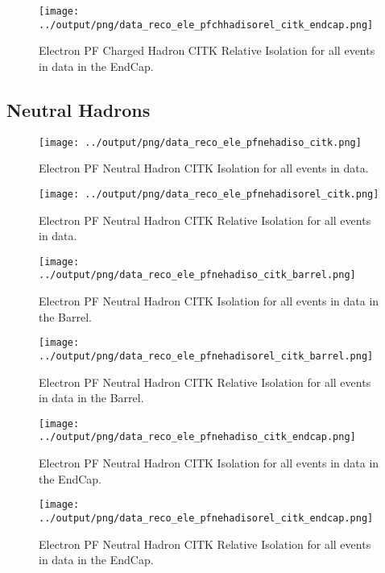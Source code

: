 \documentclass[11pt]{book}
\begin{document}
\begin{figure}[htb]
\centering
\texttt{[image: ../output/png/data\_reco\_ele\_pfchhadisorel\_citk\_endcap.png]}
\caption{Electron PF Charged Hadron CITK Relative Isolation for all events in data in the EndCap.}
\label{fig:data_ele_pfchhadisorel_citk_endcap}
\end{figure}
\clearpage

\subsection{Neutral Hadrons}
\begin{figure}[htb]
\centering
\texttt{[image: ../output/png/data\_reco\_ele\_pfnehadiso\_citk.png]}
\caption{Electron PF Neutral Hadron CITK Isolation for all events in data.}
\label{fig:data_ele_pfnehadiso_citk}
\end{figure}

\begin{figure}[htb]
\centering
\texttt{[image: ../output/png/data\_reco\_ele\_pfnehadisorel\_citk.png]}
\caption{Electron PF Neutral Hadron CITK Relative Isolation for all events in data.}
\label{fig:data_ele_pfnehadisorel_citk}
\end{figure}

\begin{figure}[htb]
\centering
\texttt{[image: ../output/png/data\_reco\_ele\_pfnehadiso\_citk\_barrel.png]}
\caption{Electron PF Neutral Hadron CITK Isolation for all events in data in the Barrel.}
\label{fig:data_ele_pfnehadiso_citk_barrel}
\end{figure}

\begin{figure}[htb]
\centering
\texttt{[image: ../output/png/data\_reco\_ele\_pfnehadisorel\_citk\_barrel.png]}
\caption{Electron PF Neutral Hadron CITK Relative Isolation for all events in data in the Barrel.}
\label{fig:data_ele_pfnehadisorel_citk_barrel}
\end{figure}

\begin{figure}[htb]
\centering
\texttt{[image: ../output/png/data\_reco\_ele\_pfnehadiso\_citk\_endcap.png]}
\caption{Electron PF Neutral Hadron CITK Isolation for all events in data in the EndCap.}
\label{fig:data_ele_pfnehadiso_citk_endcap}
\end{figure}

\begin{figure}[htb]
\centering
\texttt{[image: ../output/png/data\_reco\_ele\_pfnehadisorel\_citk\_endcap.png]}
\caption{Electron PF Neutral Hadron CITK Relative Isolation for all events in data in the EndCap.}
\label{fig:data_ele_pfnehadisorel_citk_endcap}
\end{figure}
\clearpage
\end{document}
